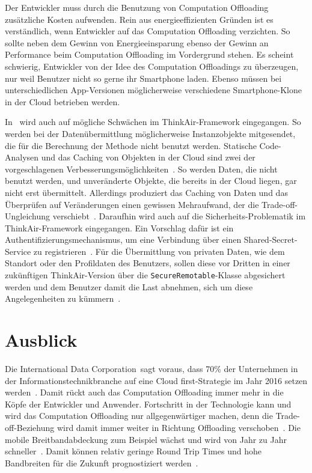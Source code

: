 \documentclass{sigchi}
\begin{document}
Der Entwickler muss durch die Benutzung von Computation Offloading zusätzliche Kosten aufwenden.
Rein aus energieeffizienten Gründen ist es verständlich, wenn Entwickler auf das Computation Offloading verzichten.
So sollte neben dem Gewinn von Energieeinsparung ebenso der Gewinn an Performance beim Computation Offloading im Vordergrund stehen.
Es scheint schwierig, Entwickler von der Idee des Computation Offloadings zu überzeugen, nur weil Benutzer nicht so gerne ihr Smartphone laden.
Ebenso müssen bei unterschiedlichen App-Versionen möglicherweise verschiedene Smartphone-Klone in der Cloud betrieben werden.

In~\cite{thinkair} wird auch auf mögliche Schwächen im ThinkAir-Framework eingegangen.
So werden bei der Datenübermittlung möglicherweise Instanzobjekte mitgesendet, die für die Berechnung der Methode nicht benutzt werden.
Statische Code-Analysen und das Caching von Objekten in der Cloud sind zwei der vorgeschlagenen Verbesserungsmöglichkeiten~\cite{thinkair}.
So werden Daten, die nicht benutzt werden, und unveränderte Objekte, die bereits in der Cloud liegen, gar nicht erst übermittelt.
Allerdings produziert das Caching von Daten und das Überprüfen auf Veränderungen einen gewissen Mehraufwand, der die Trade-off-Ungleichung verschiebt~\cite{thinkair}.
Daraufhin wird auch auf die Sicherheits-Problematik im ThinkAir-Framework eingegangen.
Ein Vorschlag dafür ist ein Authentifizierungsmechanismus, um eine Verbindung über einen Shared-Secret-Service zu registrieren~\cite{thinkair}.
Für die Übermittlung von privaten Daten, wie dem Standort oder den Profildaten des Benutzers, sollen diese vor Dritten in einer zukünftigen ThinkAir-Version über die \texttt{SecureRemotable}-Klasse abgesichert werden und dem Benutzer damit die Last abnehmen, sich um diese Angelegenheiten zu kümmern~\cite{thinkair}.

\section{Ausblick}

Die \glqq International Data Corporation\grqq\ sagt voraus, dass 70\% der Unternehmen in der Informationstechnikbranche auf eine \glqq Cloud first\grqq-Strategie im Jahr 2016 setzen werden~\cite{thoughtsoncloud}.
Damit rückt auch das Computation Offloading immer mehr in die Köpfe der Entwickler und Anwender.
Fortschritt in der Technologie kann und wird das Computation Offloading nur allgegenwärtiger machen, denn die Trade-off-Beziehung wird damit immer weiter in Richtung Offloading verschoben~\cite{o12}.
Die mobile Breitbandabdeckung zum Beispiel wächst und wird von Jahr zu Jahr schneller~\cite{thoughtsoncloud, thinkair}.
Damit können relativ geringe Round Trip Times und hohe Bandbreiten für die Zukunft prognostiziert werden~\cite{thinkair}.
\end{document}
